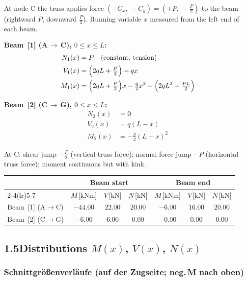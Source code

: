 \documentclass[a4paper,11pt]{article}
\begin{document}
At node C the truss applies force $(-C_x,\,-C_y) = (+P,\,-\tfrac{P}{2})$
to the beam (rightward $P$, downward $\tfrac{P}{2}$).
Running variable $x$ measured from the left end of each beam.

\textbf{Beam~[1] (A\,$\to$\,C), $0 \le x \le L$:}
\begin{align*}
  N_1(x) &= P \quad\text{(constant, tension)} \\
  V_1(x) &= \Bigl(2qL + \tfrac{P}{2}\Bigr) - qx \\
  M_1(x) &= \Bigl(2qL + \tfrac{P}{2}\Bigr)x - \tfrac{q}{2}x^2
            - \Bigl(2qL^2 + \tfrac{PL}{2}\Bigr)
\end{align*}

\textbf{Beam~[2] (C\,$\to$\,G), $0 \le x \le L$:}
\begin{align*}
  N_2(x) &= 0 \\
  V_2(x) &= q(L - x) \\
  M_2(x) &= -\tfrac{q}{2}(L - x)^2
\end{align*}

At C: shear jump $-\tfrac{P}{2}$ (vertical truss force);
normal-force jump $-P$ (horizontal truss force); moment continuous but with kink.

\medskip
\begin{center}
\begin{tabular}{l cccccc}
\toprule
 & \multicolumn{3}{c}{\textbf{Beam start}} & \multicolumn{3}{c}{\textbf{Beam end}} \\
\cmidrule(lr){2-4}\cmidrule(lr){5-7}
 & $M$\,[kNm] & $V$\,[kN] & $N$\,[kN]
 & $M$\,[kNm] & $V$\,[kN] & $N$\,[kN] \\
\midrule
Beam~[1] (A$\to$C) & $-44.00$ & $22.00$ & $20.00$ & $-6.00$ & $16.00$ & $20.00$ \\[3pt]
Beam~[2] (C$\to$G) & $-6.00$ & $6.00$ & $0.00$ & $-0.00$ & $0.00$ & $0.00$ \\
\bottomrule
\end{tabular}
\end{center}

\subsection*{1.5\quad Distributions $M(x)$, $V(x)$, $N(x)$}


\subsubsection*{Schnittgrößenverläufe (auf der Zugseite; neg.\,M nach oben)}
\end{document}

